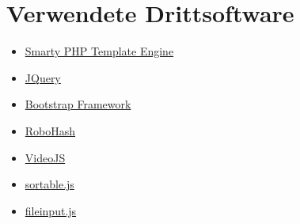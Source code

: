 \section{Verwendete Drittsoftware}
\begin{itemize}
	\item \href{http://www.smarty.net/}{Smarty PHP Template Engine}
	\item \href{https://jquery.com/}{JQuery}
	\item \href{http://getbootstrap.com/}{Bootstrap Framework}
	\item \href{https://robohash.org/}{RoboHash}
	\item \href{http://videojs.com/}{VideoJS}
	\item \href{https://github.com/RubaXa/Sortable}{sortable.js}
	\item \href{http://plugins.krajee.com/file-input}{fileinput.js}
\end{itemize}













